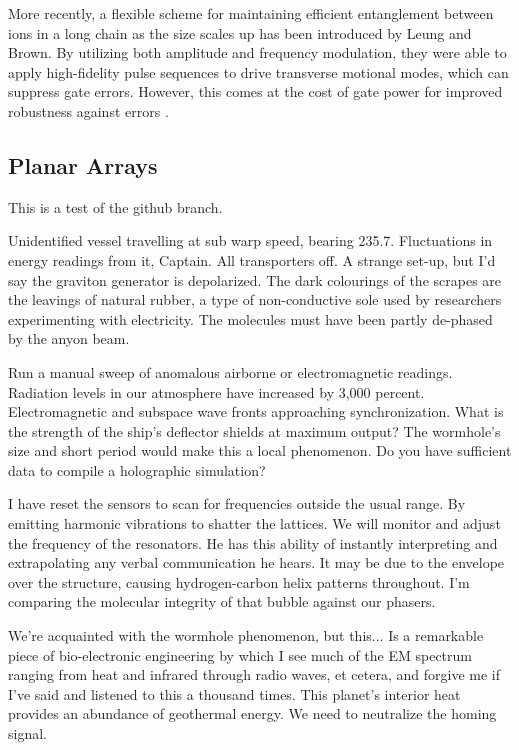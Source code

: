 More recently, a flexible scheme for maintaining efficient entanglement between ions in a long chain as the size scales up has been introduced by Leung and Brown. By utilizing both amplitude and frequency modulation, they were able to apply high-fidelity pulse sequences to drive transverse motional modes, which can suppress gate errors. However, this comes at the cost of gate power for improved robustness against errors \cite{Leung}.

\subsection{Planar Arrays}
This is a test of the github branch.

Unidentified vessel travelling at sub warp speed, bearing 235.7. Fluctuations in energy readings from it, Captain. All transporters off. A strange set-up, but I'd say the graviton generator is depolarized. The dark colourings of the scrapes are the leavings of natural rubber, a type of non-conductive sole used by researchers experimenting with electricity. The molecules must have been partly de-phased by the anyon beam.

Run a manual sweep of anomalous airborne or electromagnetic readings. Radiation levels in our atmosphere have increased by 3,000 percent. Electromagnetic and subspace wave fronts approaching synchronization. What is the strength of the ship's deflector shields at maximum output? The wormhole's size and short period would make this a local phenomenon. Do you have sufficient data to compile a holographic simulation?

I have reset the sensors to scan for frequencies outside the usual range. By emitting harmonic vibrations to shatter the lattices. We will monitor and adjust the frequency of the resonators. He has this ability of instantly interpreting and extrapolating any verbal communication he hears. It may be due to the envelope over the structure, causing hydrogen-carbon helix patterns throughout. I'm comparing the molecular integrity of that bubble against our phasers.

We're acquainted with the wormhole phenomenon, but this... Is a remarkable piece of bio-electronic engineering by which I see much of the EM spectrum ranging from heat and infrared through radio waves, et cetera, and forgive me if I've said and listened to this a thousand times. This planet's interior heat provides an abundance of geothermal energy. We need to neutralize the homing signal.

